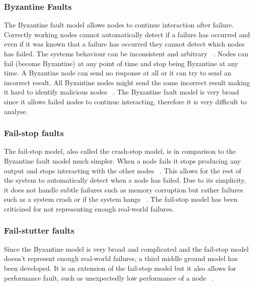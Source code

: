 \documentclass{cslthse-msc}
\begin{document}
\subsubsection{Byzantine Faults} \label{subsub:background_byzantine}
The Byzantine fault model allows nodes to continue interaction after failure. Correctly working nodes cannot automatically detect if a failure has occurred and even if it was known that a failure has occurred they cannot detect which nodes has failed. The systems behaviour can be inconsistent and arbitrary ~\cite{surveyFaultParallel}. Nodes can fail (become Byzantine) at any point of time and stop being Byzantine at any time. A Byzantine node can send no response at all or it can try to send an incorrect result. All Byzantine nodes might send the same incorrect result making it hard to identify malicious nodes ~\cite{selfAdaptRel}. %
The Byzantine fault model is very broad since it allows failed nodes to continue interacting, therefore it is very difficult to analyse.


\subsubsection{Fail-stop faults} \label{subsub:background_fail_stop}
The fail-stop model, also called the crash-stop model, is in comparison to the Byzantine fault model much simpler. When a node fails it stops producing any output and stops interacting with the other nodes ~\cite{faultTolerantFundamentals}. This allows for the rest of the system to automatically detect when a node has failed. Due to its simplicity, it does not handle subtle failures such as memory corruption but rather failures such as a system crash or if the system hangs ~\cite{surveyFaultParallel}. The fail-stop model has been criticized for not representing enough real-world failures.


\subsubsection{Fail-stutter faults}
Since the Byzantine model is very broad and complicated and the fail-stop model doesn't represent enough real-world failures, a third middle ground model has been developed. It is an extension of the fail-stop model but it also allows for performance fault, such as unexpectedly low performance of a node ~\cite{surveyFaultParallel}.
\end{document}
